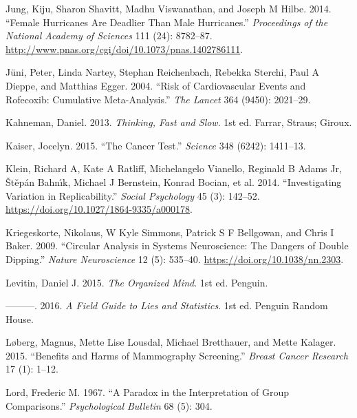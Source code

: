 \documentclass[
  10pt,
  b5paper]{book}
\newlength{\cslhangindent}
\newlength{\cslentryspacingunit} %
\newenvironment{CSLReferences}[2] %
 {%
  \setlength{\parindent}{0pt}
  \ifodd #1
  \let\oldpar\par
  \def\par{\hangindent=\cslhangindent\oldpar}
  \fi
  \setlength{\parskip}{#2\cslentryspacingunit}
 }%
 {}
\begin{document}
\begin{CSLReferences}{1}{0}
\leavevmode{}%
Jung, Kiju, Sharon Shavitt, Madhu Viswanathan, and Joseph M Hilbe. 2014. {``Female Hurricanes Are Deadlier Than Male Hurricanes.''} \emph{Proceedings of the National Academy of Sciences} 111 (24): 8782--87. \url{http://www.pnas.org/cgi/doi/10.1073/pnas.1402786111}.

\leavevmode{}%
Jüni, Peter, Linda Nartey, Stephan Reichenbach, Rebekka Sterchi, Paul A Dieppe, and Matthias Egger. 2004. {``Risk of Cardiovascular Events and Rofecoxib: Cumulative Meta-Analysis.''} \emph{The Lancet} 364 (9450): 2021--29.

\leavevmode{}%
Kahneman, Daniel. 2013. \emph{Thinking, Fast and Slow}. 1st ed. Farrar, Straus; Giroux.

\leavevmode{}%
Kaiser, Jocelyn. 2015. {``The Cancer Test.''} \emph{Science} 348 (6242): 1411--13.

\leavevmode{}%
Klein, Richard A, Kate A Ratliff, Michelangelo Vianello, Reginald B Adams Jr, Štěpán Bahnı́k, Michael J Bernstein, Konrad Bocian, et al. 2014. {``Investigating Variation in Replicability.''} \emph{Social Psychology} 45 (3): 142--52. \url{https://doi.org/10.1027/1864-9335/a000178}.

\leavevmode{}%
Kriegeskorte, Nikolaus, W Kyle Simmons, Patrick S F Bellgowan, and Chris I Baker. 2009. {``Circular Analysis in Systems Neuroscience: The Dangers of Double Dipping.''} \emph{Nature Neuroscience} 12 (5): 535--40. \url{https://doi.org/10.1038/nn.2303}.

\leavevmode{}%
Levitin, Daniel J. 2015. \emph{The Organized Mind}. 1st ed. Penguin.

\leavevmode{}%
---------. 2016. \emph{A Field Guide to Lies and Statistics}. 1st ed. Penguin Random House.

\leavevmode{}%
Løberg, Magnus, Mette Lise Lousdal, Michael Bretthauer, and Mette Kalager. 2015. {``Benefits and Harms of Mammography Screening.''} \emph{Breast Cancer Research} 17 (1): 1--12.

\leavevmode{}%
Lord, Frederic M. 1967. {``A Paradox in the Interpretation of Group Comparisons.''} \emph{Psychological Bulletin} 68 (5): 304.


\end{CSLReferences}
\end{document}
